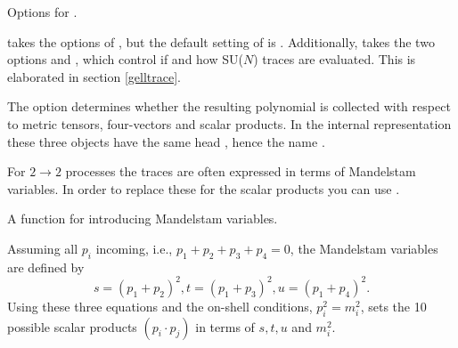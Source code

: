 
 {Options for .}

 takes the options of , but the 
default setting of  is . 
Additionally,  takes the two options  and , 
which control if and how SU($N$) traces are evaluated. This is elaborated 
in section \ref{gelltrace}.

The option  determines whether the resulting polynomial is 
collected with respect to metric tensors, four-vectors and scalar products. 
In the internal representation these three objects have the same head 
, hence the name .

For $2 \rightarrow 2$ processes the traces are often expressed in terms of 
Mandelstam variables. In order to replace these for the scalar products you can use 
. 

 {A function for introducing Mandelstam variables.}

Assuming all $p_i$ incoming, i.e., $p_1+p_2+p_3+p_4=0$, the Mandelstam variables are defined by
\[
s=(p_1+p_2)^{2}, t=(p_1+p_3)^{2}, u=(p_1+p_4)^{2}.
\]
Using these three equations and the on-shell conditions, $p_i^{2}=m_i^{2}$,  sets the 10 possible scalar products $(p_i \cdot p_j)$ in terms of $s, t, u$ and $m_i^{2}$.

